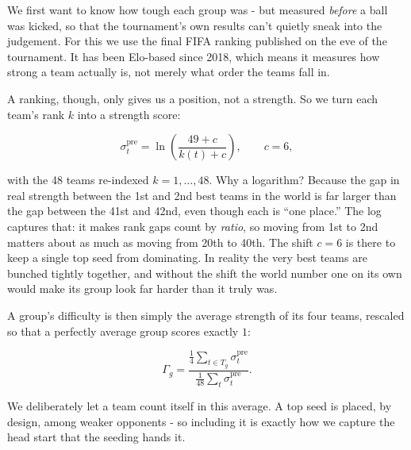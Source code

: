 \documentclass[11pt]{article}
\newcommand{\str}{\sigma}            %
\newcommand{\gdiff}{\Gamma}          %
\begin{document}
We first want to know how tough each group was - but measured \emph{before} a ball was kicked, so that the tournament's own results can't quietly sneak into the judgement. For this we use the final FIFA ranking published on the eve of the tournament. It has been Elo-based since 2018, which means it measures how strong a team actually is, not merely what order the teams fall in.

A ranking, though, only gives us a position, not a strength. So we turn each team's rank $k$ into a strength score:

\begin{equation}
\str^{\mathrm{pre}}_t = \ln\!\left(\frac{49+c}{k(t)+c}\right), \qquad c = 6,
\label{eq:logrank}
\end{equation}

with the 48 teams re-indexed $k = 1,\dots,48$. Why a logarithm? Because the gap in real strength between the 1st and 2nd best teams in the world is far larger than the gap between the 41st and 42nd, even though each is ``one place.'' The log captures that: it makes rank gaps count by \emph{ratio}, so moving from 1st to 2nd matters about as much as moving from 20th to 40th. The shift $c = 6$ is there to keep a single top seed from dominating. In reality the very best teams are bunched tightly together, and without the shift the world number one on its own would make its group look far harder than it truly was.

A group's difficulty is then simply the average strength of its four teams, rescaled so that a perfectly average group scores exactly $1$:

\begin{equation}
\gdiff_g = \frac{\tfrac14\sum_{t\in T_g}\str^{\mathrm{pre}}_t}{\tfrac{1}{48}\sum_t \str^{\mathrm{pre}}_t}.
\label{eq:groupdiff}
\end{equation}

We deliberately let a team count itself in this average. A top seed is placed, by design, among weaker opponents - so including it is exactly how we capture the head start that the seeding hands it.
\end{document}
